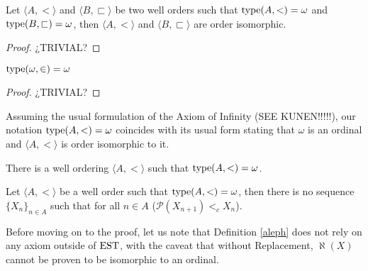 \begin{lemma}[$\esti$]
	Let $\langle A,< \rangle$ and $\langle B,\sqsubset \rangle$ be two well orders such that $\operatorname{type}(A,<) = \omega$ and $\operatorname{type}(B,\sqsubset) = \omega$, then $\langle A,< \rangle$ and $\langle B,\sqsubset \rangle$ are order isomorphic.
\end{lemma}
\begin{proof}
	¿TRIVIAL?
\end{proof}

\begin{lemma}[$\esti$]
	$\operatorname{type}(\omega,\in) = \omega$
\end{lemma}
\begin{proof}
	¿TRIVIAL?
\end{proof}

\begin{corollary}
	Assuming the usual formulation of the Axiom of Infinity (SEE KUNEN!!!!!), our notation  $\operatorname{type}(A,<) = \omega$ coincides with its usual form stating that $\omega$ is an ordinal and $\langle A,< \rangle$ is order isomorphic to it.
\end{corollary}





\begin{prop}[$\esti$]
	There is a well ordering $\langle A,< \rangle$ such that 
	$\operatorname{type}(A,<) = \omega$.
\end{prop}

\begin{theorem}[$\esti$]
	\label{hartogs_set}
	Let $\langle A,< \rangle$ be a well order such that $\operatorname{type}(A,<) = \omega$, then there is no sequence $\{X_n\}_{n\in A}$ such that for all $n\in A$ ($\mathcal{P}(X_{n+1}) <_c X_n$).
\end{theorem}

Before moving on to the proof, let us note that Definition \ref{aleph} does not rely on any axiom outside of $\operatorname{\text{EST}}$, with the caveat that without Replacement, $\aleph(X)$ cannot be proven to be isomorphic to an ordinal.

